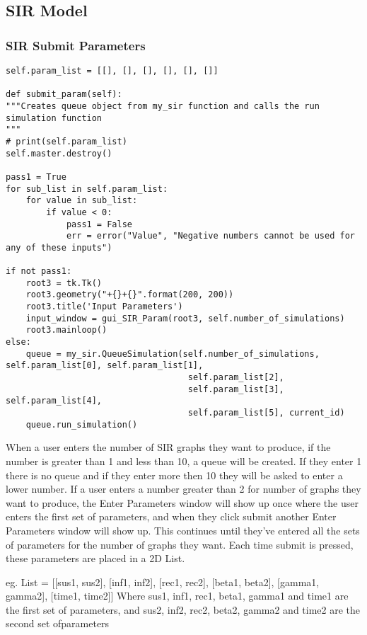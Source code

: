 \documentclass[11pt, a4paper]{article}
\begin{document}
\subsection{SIR Model}
\subsubsection{SIR Submit Parameters}
\begin{lstlisting}
self.param_list = [[], [], [], [], [], []]

def submit_param(self):
"""Creates queue object from my_sir function and calls the run simulation function
"""
# print(self.param_list)
self.master.destroy()

pass1 = True
for sub_list in self.param_list:
    for value in sub_list:
        if value < 0:
            pass1 = False
            err = error("Value", "Negative numbers cannot be used for any of these inputs")

if not pass1:
    root3 = tk.Tk()
    root3.geometry("+{}+{}".format(200, 200))
    root3.title('Input Parameters')
    input_window = gui_SIR_Param(root3, self.number_of_simulations)
    root3.mainloop()
else:
    queue = my_sir.QueueSimulation(self.number_of_simulations, self.param_list[0], self.param_list[1],
                                    self.param_list[2],
                                    self.param_list[3], self.param_list[4],
                                    self.param_list[5], current_id)
    queue.run_simulation()
\end{lstlisting}
When a user enters the number of SIR graphs they want to produce, if the number is greater than 1 and less than 10, a queue will be created. If they enter 1 there is no queue and if they enter more then 10 they will be asked to enter a lower number.
If a user enters a number greater than 2 for number of graphs they want to produce, the Enter Parameters window will show up once where the user enters the first set of parameters, and when they click submit another Enter Parameters window will show up. This continues until they've entered all the sets of parameters for the number of graphs they want. Each time submit is pressed, these parameters are placed in a 2D List.

eg. List = [[sus1, sus2], [inf1, inf2], [rec1, rec2], [beta1, beta2], [gamma1, gamma2], [time1, time2]]
Where sus1, inf1, rec1, beta1, gamma1 and time1 are the first set of parameters, and sus2, inf2, rec2, beta2, gamma2 and time2 are the second set ofparameters
\end{document}
